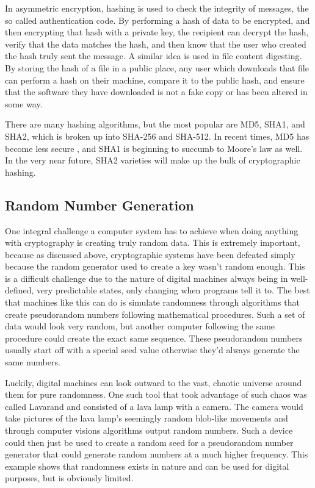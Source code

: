 \documentclass[journal]{IEEEtran}
\begin{document}
In asymmetric encryption, hashing is used to check the integrity of messages, the so called authentication code.  By performing a hash of data to be encrypted, and then encrypting that hash with a private key, the recipient can decrypt the hash, verify that the data matches the hash, and then know that the user who created the hash truly sent the message.  A similar idea is used in file content digesting.  By storing the hash of a file in a public place, any user which downloads that file can perform a hash on their machine, compare it to the public hash, and ensure that the software they have downloaded is not a fake copy or has been altered in some way.

There are many hashing algorithms, but the most popular are MD5, SHA1, and SHA2, which is broken up into SHA-256 and SHA-512.  In recent times, MD5 has become less secure \cite{hashRainbow} \cite{hashBotnet}, and SHA1 is beginning to succumb to Moore's law as well.  In the very near future, SHA2 varieties will make up the bulk of cryptographic hashing.



\subsection{Random Number Generation}

One integral challenge a computer system has to achieve when doing anything with cryptography is creating truly random data.  This is extremely important, because as discussed above, cryptographic systems have been defeated simply because the random generator used to create a key wasn't random enough.  This is a difficult challenge due to the nature of digital machines always being in well-defined, very predictable states, only changing when programs tell it to.  The best that machines like this can do is simulate randomness through algorithms that create pseudorandom numbers following mathematical procedures.  Such a set of data would look very random, but another computer following the same procedure could create the exact same sequence.  These pseudorandom numbers usually start off with a special seed value otherwise they'd always generate the same numbers.

Luckily, digital machines can look outward to the vast, chaotic universe around them for pure randomness.  One such tool that took advantage of such chaos was called Lavarand and consisted of a lava lamp with a camera.  The camera would take pictures of the lava lamp's seemingly random blob-like movements and through computer visions algorithms output random numbers.  Such a device could then just be used to create a random seed for a pseudorandom number generator that could generate random numbers at a much higher frequency.  This example shows that randomness exists in nature and can be used for digital purposes, but is obviously limited.  
\end{document}
